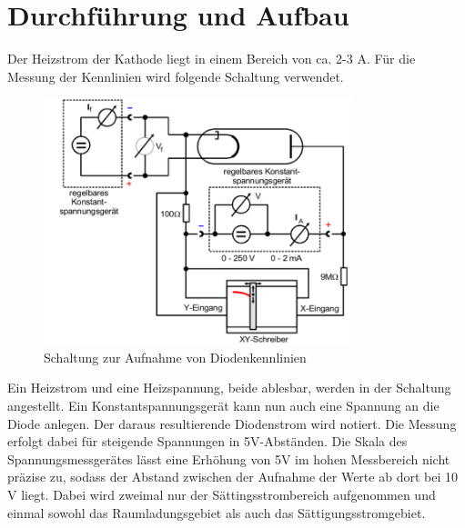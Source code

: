 \section{Durchführung und Aufbau}
\label{sec:Durchführung}

Der Heizstrom der Kathode liegt in einem Bereich von ca. 2-3 A.
Für die Messung der Kennlinien wird folgende Schaltung verwendet.

\begin{figure}[H]
  \centering
  \includegraphics[width=0.8\textwidth]{content/7.png}
  \caption{Schaltung zur Aufnahme von Diodenkennlinien \cite{sample}}
  \label{fig:7}
\end{figure}

Ein Heizstrom und eine Heizspannung, beide ablesbar, werden in der Schaltung angestellt. Ein Konstantspannungsgerät
kann nun auch eine Spannung an die Diode anlegen. Der daraus resultierende Diodenstrom wird notiert. Die Messung 
erfolgt dabei für steigende Spannungen in 5V-Abständen. Die Skala des Spannungsmessgerätes lässt eine Erhöhung von 5V im hohen Messbereich nicht präzise zu, sodass der Abstand zwischen der Aufnahme der Werte
ab dort bei 10 V liegt. Dabei wird zweimal nur der Sättingsstrombereich aufgenommen und einmal sowohl das Raumladungsgebiet als auch das Sättigungsstromgebiet.

